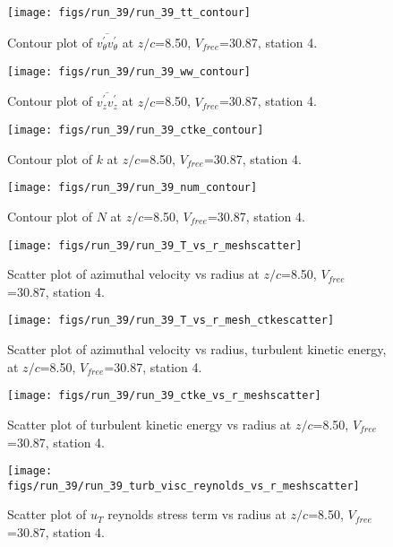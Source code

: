 \begin{figure}[H]
\centering
\texttt{[image: figs/run\_39/run\_39\_tt\_contour]}
\caption{Contour plot of $\overline{v_{\theta}^{\prime} v_{\theta}^{\prime}}$ at $z/c$=8.50, $V_{free}$=30.87, station 4.}
\end{figure}


\begin{figure}[H]
\centering
\texttt{[image: figs/run\_39/run\_39\_ww\_contour]}
\caption{Contour plot of $\overline{v_{z}^{\prime} v_{z}^{\prime}}$ at $z/c$=8.50, $V_{free}$=30.87, station 4.}
\end{figure}


\begin{figure}[H]
\centering
\texttt{[image: figs/run\_39/run\_39\_ctke\_contour]}
\caption{Contour plot of $k$ at $z/c$=8.50, $V_{free}$=30.87, station 4.}
\end{figure}


\begin{figure}[H]
\centering
\texttt{[image: figs/run\_39/run\_39\_num\_contour]}
\caption{Contour plot of $N$ at $z/c$=8.50, $V_{free}$=30.87, station 4.}
\end{figure}


\begin{figure}[H]
\centering
\texttt{[image: figs/run\_39/run\_39\_T\_vs\_r\_meshscatter]}
\caption{Scatter plot of azimuthal velocity vs radius at $z/c$=8.50, $V_{free}$=30.87, station 4.}
\end{figure}


\begin{figure}[H]
\centering
\texttt{[image: figs/run\_39/run\_39\_T\_vs\_r\_mesh\_ctkescatter]}
\caption{Scatter plot of azimuthal velocity vs radius, turbulent kinetic energy, at $z/c$=8.50, $V_{free}$=30.87, station 4.}
\end{figure}


\begin{figure}[H]
\centering
\texttt{[image: figs/run\_39/run\_39\_ctke\_vs\_r\_meshscatter]}
\caption{Scatter plot of turbulent kinetic energy vs radius at $z/c$=8.50, $V_{free}$=30.87, station 4.}
\end{figure}


\begin{figure}[H]
\centering
\texttt{[image: figs/run\_39/run\_39\_turb\_visc\_reynolds\_vs\_r\_meshscatter]}
\caption{Scatter plot of $
u_T$ reynolds stress term vs radius at $z/c$=8.50, $V_{free}$=30.87, station 4.}
\end{figure}


